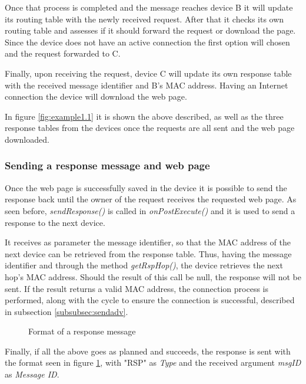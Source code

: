 Once that process is completed and the message reaches device B it will update its routing table with the newly received request. After that it checks its own routing table and assesses if it should forward the request or download the page. Since the device does not have an active connection the first option will chosen and the request forwarded to C.

Finally, upon receiving the request, device C will update its own response table with the received message identifier and B's \gls{MAC} address. Having an Internet connection the device will download the web page.

In figure \ref{fig:example1.1} it is shown the above described, as well as the three response tables from the devices once the requests are all sent and the web page downloaded.

\subsubsection{Sending a response message and web page}
\label{subsubsec:sendrsp}

Once the web page is successfully saved in the device it is possible to send the response back until the owner of the request receives the requested web page. As seen before, \textit{sendResponse()} is called in \textit{onPostExecute()} and it is used to send a response to the next device.

It receives as parameter the message identifier, so that the \gls{MAC} address of the next device can be retrieved from the response table. Thus, having the message identifier and through the method \textit{getRspHop()}, the device retrieves the next hop's \gls{MAC} address. Should the result of this call be null, the response will not be sent. If the result returns a valid \gls{MAC} address, the connection process is performed, along with the cycle to ensure the connection is successful, described in subsection \ref{subsubsec:sendadv}.

\begin{figure}[ht]
   \noindent{}
	\caption{\label{fig:rspmsg} Format of a response message}
\end{figure}

Finally, if all the above goes as planned and succeeds, the response is sent with the format seen in figure \ref{fig:rspmsg}, with "RSP" as \textit{Type} and the received argument \textit{msgID} as \textit{Message ID}.

